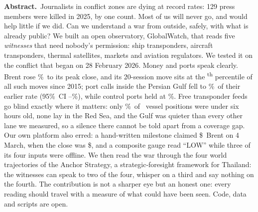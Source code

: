 \documentclass[10pt,twocolumn,letterpaper]{article}
\newcommand{\pct}{\%}
\begin{document}

\noindent\textbf{Abstract.}\ Journalists in conflict zones are dying at record rates: 129 press members were killed in 2025, by one count. Most of us will never go, and would help little if we did. Can we understand a war from outside, safely, with what is already public? We built an open observatory, GlobalWatch, that reads five \emph{witnesses} that need nobody's permission: ship transponders, aircraft transponders, thermal satellites, markets and aviation regulators. We tested it on the conflict that began on 28 February 2026. Money and ports speak clearly. Brent rose \BrentPeakPct\pct\ to its peak close, and its 20-session move sits at the \PctileTwenty\textsuperscript{th} percentile of all such moves since 2015; port calls inside the Persian Gulf fell to \GulfRatio\pct\ of their earlier rate (95\pct\ CI \GulfLo--\GulfHi\pct), while control ports held at \CtrlRatio\pct. Free transponder feeds go blind exactly where it matters: only \AisFreshPct\pct\ of \AisTotal\ vessel positions were under six hours old, none lay in the Red Sea, and the Gulf was quieter than every other lane we measured, so a silence there cannot be told apart from a coverage gap. Our own platform also erred: a hand-written milestone claimed \$\AuditClaim\ Brent on 4 March, when the close was \$\AuditClose, and a composite gauge read ``LOW'' while three of its four inputs were offline. We then read the war through the four world trajectories of the Anchor Strategy, a strategic-foresight framework for Thailand: the witnesses can speak to two of the four, whisper on a third and say nothing on the fourth. The contribution is not a sharper eye but an honest one: every reading should travel with a measure of what could have been seen. Code, data and scripts are open.
\end{document}

